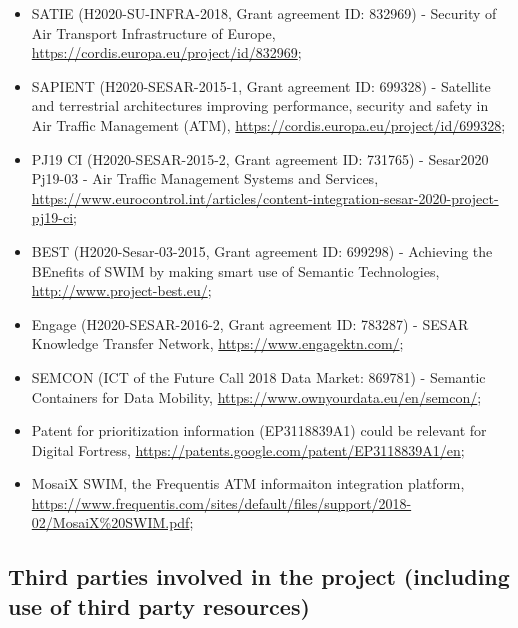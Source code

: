 \documentclass[a4paper,11pt]{article}
\begin{document}
\begin{itemize}

\item SATIE (H2020-SU-INFRA-2018, Grant agreement ID: 832969) - Security of Air Transport Infrastructure of Europe, \url{https://cordis.europa.eu/project/id/832969};

\item SAPIENT (H2020-SESAR-2015-1, Grant agreement ID: 699328) - Satellite and terrestrial architectures improving performance, security and safety in Air Traffic Management (ATM), \url{https://cordis.europa.eu/project/id/699328};

\item PJ19 CI (H2020-SESAR-2015-2, Grant agreement ID: 731765) - Sesar2020 Pj19-03 - Air Traffic Management Systems and Services, \url{https://www.eurocontrol.int/articles/content-integration-sesar-2020-project-pj19-ci};

\item BEST (H2020-Sesar-03-2015, Grant agreement ID: 699298) - Achieving the BEnefits of SWIM by making smart use of Semantic Technologies, \url{http://www.project-best.eu/};

\item Engage (H2020-SESAR-2016-2, Grant agreement ID: 783287) - SESAR Knowledge Transfer Network, \url{https://www.engagektn.com/};

\item SEMCON (ICT of the Future Call 2018 Data Market: 869781) - Semantic Containers for Data Mobility, \url{https://www.ownyourdata.eu/en/semcon/};

\item Patent for prioritization information (EP3118839A1) could be relevant for Digital Fortress, \url{https://patents.google.com/patent/EP3118839A1/en};

\item MosaiX SWIM, the Frequentis ATM informaiton integration platform, \url{https://www.frequentis.com/sites/default/files/support/2018-02/MosaiX\%20SWIM.pdf}; 

\end{itemize}





\subsection{Third parties involved in the project (including use of third party resources)}
\end{document}
